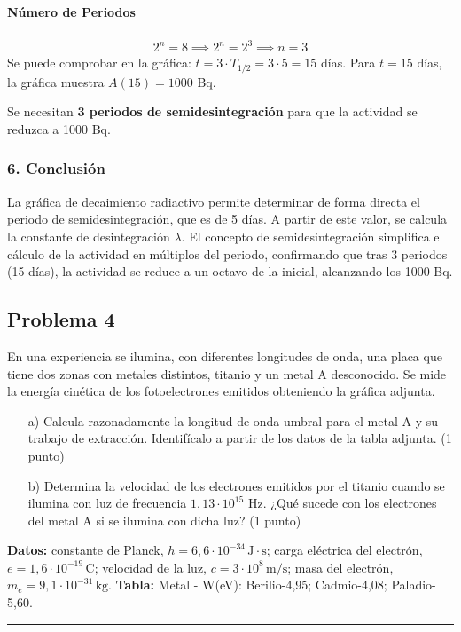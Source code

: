 \paragraph*{Número de Periodos}
\begin{gather}
    2^n = 8 \implies 2^n = 2^3 \implies n=3
\end{gather}
Se puede comprobar en la gráfica: $t = 3 \cdot T_{1/2} = 3 \cdot 5 = 15$ días. Para $t=15$ días, la gráfica muestra $A(15) = 1000$ Bq.
\begin{cajaresultado}
    Se necesitan \textbf{3 periodos de semidesintegración} para que la actividad se reduzca a 1000 Bq.
\end{cajaresultado}

\subsubsection*{6. Conclusión}
\begin{cajaconclusion}
La gráfica de decaimiento radiactivo permite determinar de forma directa el periodo de semidesintegración, que es de 5 días. A partir de este valor, se calcula la constante de desintegración $\lambda$. El concepto de semidesintegración simplifica el cálculo de la actividad en múltiplos del periodo, confirmando que tras 3 periodos (15 días), la actividad se reduce a un octavo de la inicial, alcanzando los 1000 Bq.
\end{cajaconclusion}

\newpage

\subsection{Problema 4}
\label{subsec:P4_2023_jul_ord}

\begin{cajaenunciado}
En una experiencia se ilumina, con diferentes longitudes de onda, una placa que tiene dos zonas con metales distintos, titanio y un metal A desconocido. Se mide la energía cinética de los fotoelectrones emitidos obteniendo la gráfica adjunta.
\begin{enumerate}
    \item[a)] Calcula razonadamente la longitud de onda umbral para el metal A y su trabajo de extracción. Identifícalo a partir de los datos de la tabla adjunta. (1 punto)
    \item[b)] Determina la velocidad de los electrones emitidos por el titanio cuando se ilumina con luz de frecuencia $1,13\cdot10^{15}$ Hz. ¿Qué sucede con los electrones del metal A si se ilumina con dicha luz? (1 punto)
\end{enumerate}
\textbf{Datos:} constante de Planck, $h=6,6\cdot10^{-34}\,\text{J}\cdot\text{s}$; carga eléctrica del electrón, $e=1,6\cdot10^{-19}\,\text{C}$; velocidad de la luz, $c=3\cdot10^{8}\,\text{m/s}$; masa del electrón, $m_e=9,1\cdot10^{-31}\,\text{kg}$.
\textbf{Tabla:} Metal - W(eV): Berilio-4,95; Cadmio-4,08; Paladio-5,60.
\end{cajaenunciado}
\hrule

